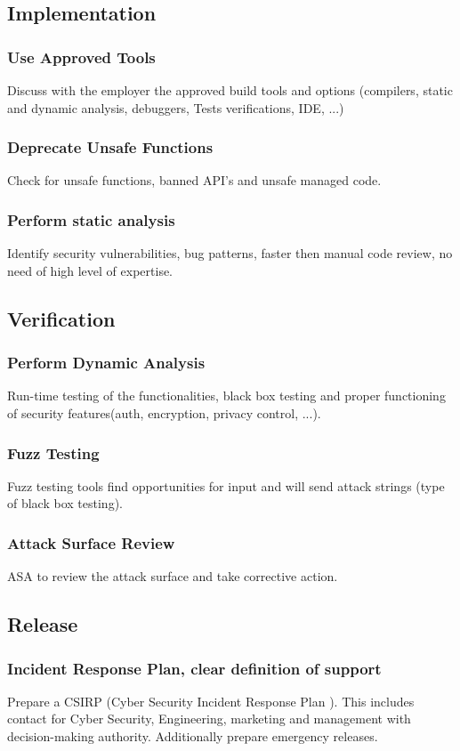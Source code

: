 \documentclass[10pt,a4paper,final]{report}
\begin{document}
\subsection{Implementation}
\subsubsection{Use Approved Tools}
Discuss with the employer the approved build tools and options (compilers, static and dynamic analysis, debuggers, Tests verifications, IDE, ...)
\subsubsection{Deprecate Unsafe Functions}
Check for unsafe functions, banned API's and unsafe managed code.
\subsubsection{Perform static analysis}
Identify security vulnerabilities, bug patterns, faster then manual code review, no need of high level of expertise.
\subsection{Verification}
\subsubsection{Perform Dynamic Analysis}
Run-time testing of the functionalities, black box testing and proper functioning of security features(auth, encryption, privacy control, ...).
\subsubsection{Fuzz Testing}
Fuzz testing tools find opportunities for input and will send attack  strings (type of black box testing).
\subsubsection{Attack Surface Review}
ASA to review the attack surface and take corrective action.
\subsection{Release}
\subsubsection{Incident Response Plan, clear definition of support}
Prepare a CSIRP (Cyber Security Incident Response Plan ). This includes contact for Cyber Security, Engineering, marketing and management with decision-making authority. Additionally prepare emergency releases.
\end{document}
